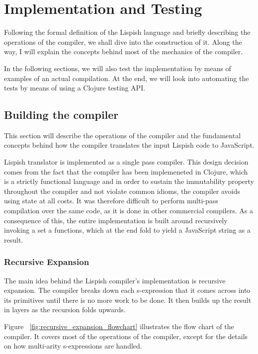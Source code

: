 \chapter{Implementation and Testing}
Following the formal definition of the Lispish language and briefly describing the operations of the compiler, we shall dive into the construction of it. Along the way, I will explain the concepts behind most of the mechanics of the compiler. 

In the following sections, we will also test the implementation by means of examples of an actual compilation. 
At the end, we will look into automating the tests by means of using a Clojure testing API.  

\section{Building the compiler}
This section will describe the operations of the compiler and the fundamental concepts behind how the compiler translates the input Lispish code to JavaScript. 

Lispish translator is implemented as a single pass compiler.
This design decision comes from the fact that the compiler has been implemeneted in Clojure, which is a strictly functional language and in order to sustain the immutability property throughout the compiler and not violate common idioms, the compiler avoids using state at all costs. It was therefore difficult to perform multi-pass compilation over the same code, as it is done in other commercial compilers. 
As a consequence of this, the entire implementation is built around recursively invoking a set a functions, which at the end fold to yield a JavaScript string as a result. 



\subsection{Recursive Expansion}
The main idea behind the Lispish compiler's implementation is recursive expansion.
The compiler breaks down each s-expression that it comes across into its primitives until there is no more work to be done. It then builds up the result in layers as the recursion folds upwards. 

Figure ~\ref{fig:recursive_expansion_flowchart} illustrates the flow chart of the compiler. It covers most of the operations of the compiler, except for the details on how multi-arity s-expressions are handled.  

